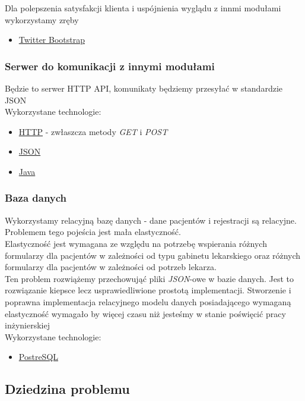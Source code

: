 \documentclass[polish,12pt]{aghthesis}
\begin{document}
Dla polepszenia satysfakcji klienta i uspójnienia wyglądu z innmi modułami wykorzystamy zręby
\begin{itemize}
  \item \href{https://getbootstrap.com/}{Twitter Bootstrap}
\end{itemize}

\subsubsection{Serwer do komunikacji z innymi modułami}
Będzie to serwer HTTP API, komunikaty będziemy przesyłać w standardzie JSON \\
Wykorzystane technologie:
\begin{itemize}
  \item \href{https://pl.wikipedia.org/wiki/Hypertext_Transfer_Protocol}{HTTP} - zwłaszcza metody \emph{GET} i \emph{POST}
  \item \href{http://www.json.org/}{JSON}
  \item \href{https://www.oracle.com/java/index.html}{Java}
\end{itemize}

\subsubsection{Baza danych}
\label{subsec:wykorzystane-technologie-baza}
Wykorzystamy relacyjną bazę danych - dane pacjentów i rejestracji są relacyjne. Problemem tego pojeścia jest mała elastyczność. \\
Elastyczność jest wymagana ze względu na potrzebę wspierania różnych formularzy dla pacjentów w zależności od typu gabinetu lekarskiego oraz różnych formularzy dla pacjentów w zależności od potrzeb lekarza. \\
Ten problem rozwiążemy przechowująć pliki \emph{JSON}-owe w bazie danych. Jest to rozwiązanie kiepsce lecz usprawiedliwione prostotą implementacji. Stworzenie i poprawna implementacja relacyjnego modelu danych posiadającego wymaganą elastyczność wymagało by więcej czasu niż jesteśmy w stanie poświęcić pracy inżynierskiej \\
Wykorzystane technologie:
\begin{itemize}
  \item \href{https://www.postgresql.org/}{PostreSQL}
\end{itemize}


\subsection{Dziedzina problemu}
\end{document}

